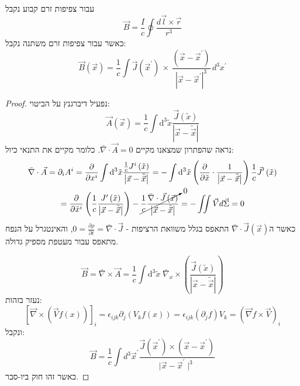 \documentclass{tstextbook}
\begin{document}
\begin{theorem}
עבור צפיפות זרם קבוע נקבל
$$\vec{B} = \frac{I}{c}\oint \frac{d\vec{l} \times \vec{r}}{r^3}$$
כאשר עבור צפיפות זרם משתנה נקבל:
$$\vec{B}\left( \vec{x} \right)={\frac{1}{c}}\int\!\vec{J}\left( \vec{x}^{\prime} \right)\,\times\,{\frac{\left( \vec{x}-\vec{x}^{\prime} \right)}{|\vec{x}-\vec{x}^{\prime}|^{3}}}\,d^{3}x^{\prime}$$

\end{theorem}
\begin{proof}
נפעיל דיברגנץ על הביטוי:
$$\vec{A}\left( \vec{x} \right)=\frac{1}{c}\int\mathrm{d}^3\tilde{x}  \frac{\vec{J}\left( \tilde{x} \right)}{\left\lvert  \vec{x}-\tilde{\vec{x}}  \right\rvert }$$
נראה שהפתרון שמצאנו מקיים \(\bar{\nabla} \cdot \vec{A}=0\). כלומר מקיים את התנאי כיול:
\begin{gather*}\bar{\nabla} \cdot \vec{A} = \partial_{i}A^i = \frac{\partial }{\partial x^i} \int\mathrm{d^3}\tilde{x} \frac{\frac{1}{c}J^i\left( \tilde{x} \right)}{\left\lvert  \vec{x}  -\tilde{\vec{x}}\right\rvert }=-\int\mathrm{d^3}\tilde{x} \left( \frac{\partial }{\partial \tilde{x}} \cdot \frac{1}{\left\lvert  \vec{x}-\tilde{\vec{x}}  \right\rvert } \right) \frac{1}{c} \vec{J}'\left( \tilde{x} \right)  \\=\frac{\partial }{\partial \tilde{x}^{i}} \left( \frac{1}{c} \frac{J'\left( \tilde{x} \right)}{\left\lvert  \vec{x}-\tilde{\vec{x}}  \right\rvert } \right)-\cancelto{ 0 }{ \frac{1}{c} \frac{\bar{\nabla} \cdot \vec{J}\left( \vec{x} \right)}{\left\lvert  \vec{x}-\tilde{\vec{x}}  \right\rvert } } = -\iint\vec{V} d\vec{\Sigma}=0
\end{gather*}
כאשר ה\(\bar{\nabla} \cdot \vec{J}\left( \vec{x} \right)\) התאפס בגלל משוואת הרציפות - \(0 = \frac{\partial \rho}{\partial t}=\bar{\nabla} \cdot \vec{J}\), והאינטגרל על הנפח מתאפס עבור מעטפת מספיק גדולה.

$$\vec{B} = \bar{\nabla} \times \vec{A} = \frac{1}{c}\int\mathrm{d^3}\tilde{x} \;\bar{\nabla}_{x} \times \left( \frac{\vec{J}\left( \tilde{x} \right)}{\left\lvert  \vec{x}-\tilde{\vec{x}}  \right\rvert } \right)$$
נעזר בזהות:
$$\left[\vec{\nabla}\times\left(\vec{V}f\left(x\right)\right)\right]_{i}=\epsilon_{i j k}\partial_{j}\left(V_{k}f\left(x\right)\right)=\epsilon_{i j k}\left(\partial_{j}f\right)V_{k}=\left(\vec{\nabla}f\times\vec{V}\right)_{i}$$
ונקבל:
$$\vec{B}=\frac{1}{c}\int d^{3}\vec{x}^{\prime}\frac{\vec{J}\left(\vec{x}^{\prime}\right)\times\left(\vec{x}-\vec{x}^{\prime}\right)}{\mid\vec{x}-\vec{x}^{\prime}\mid^{3}}$$
כאשר זהו חוק ביו-סבר.

\end{proof}
\end{document}
